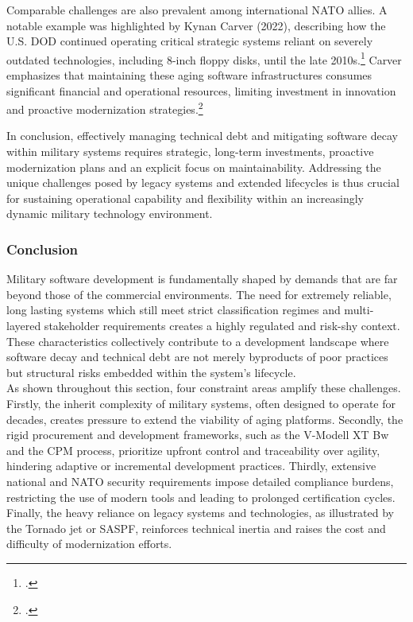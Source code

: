 Comparable challenges are also prevalent among international NATO allies. A notable example was highlighted by Kynan Carver (2022), describing how the U.S. \ac{DOD} continued operating critical strategic systems reliant on severely outdated technologies, 
including 8-inch floppy disks, until the late 2010s.\footcite{carverTechnicalDebtCybersecurity2022} Carver emphasizes that maintaining these aging software infrastructures consumes significant financial and operational resources, limiting investment in innovation and proactive modernization strategies.\footcite{carverTechnicalDebtCybersecurity2022}

In conclusion, effectively managing technical debt and mitigating software decay within military systems requires strategic, long-term investments, proactive modernization plans and an explicit focus on maintainability. Addressing the unique challenges posed by legacy 
systems and extended lifecycles is thus crucial for sustaining operational capability and flexibility within an increasingly dynamic military technology environment.

\subsubsection{Conclusion}
Military software development is fundamentally shaped by demands that are far beyond those of the commercial environments. The need for extremely reliable, long lasting systems which still meet strict classification regimes and multi-layered stakeholder requirements creates a highly regulated and risk-shy context.
These characteristics collectively contribute to a development landscape where software decay and technical debt are not merely byproducts of poor practices but structural risks embedded within the system's lifecycle.\\

As shown throughout this section, four constraint areas amplify these challenges. Firstly, the inherit complexity of military systems, often designed to operate for decades, creates pressure to extend the viability of aging platforms.
Secondly, the rigid procurement and development frameworks, such as the V-Modell XT Bw and the \ac{CPM} process, prioritize upfront control and traceability over agility, hindering adaptive or incremental development practices.
Thirdly, extensive national and NATO security requirements impose detailed compliance burdens, restricting the use of modern tools and leading to prolonged certification cycles. Finally, the heavy reliance on legacy systems and technologies, as illustrated by the Tornado jet or SASPF, 
reinforces technical inertia and raises the cost and difficulty of modernization efforts.\\

